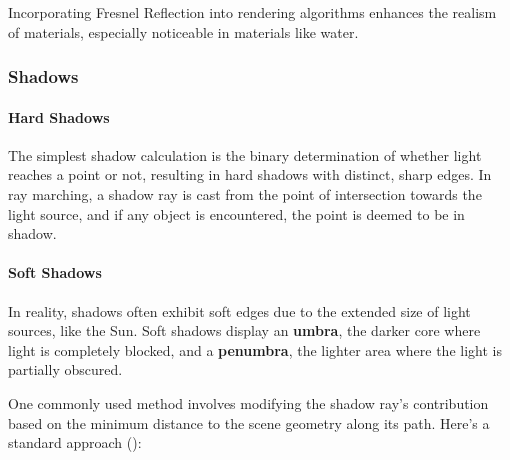 Incorporating Fresnel Reflection into rendering algorithms enhances the realism of materials, especially noticeable in materials like water. 

\subsubsection{Shadows}
\label{Shadows}

\paragraph{Hard Shadows}
The simplest shadow calculation is the binary determination of whether light reaches a point or not, resulting in hard shadows with distinct, sharp edges. In ray marching, a shadow ray is cast from the point of intersection towards the light source, and if any object is encountered, the point is deemed to be in shadow.

\paragraph{Soft Shadows}
In reality, shadows often exhibit soft edges due to the extended size of light sources, like the Sun. Soft shadows display an \textbf{umbra}, the darker core where light is completely blocked, and a \textbf{penumbra}, the lighter area where the light is partially obscured.


One commonly used method involves modifying the shadow ray's contribution based on the minimum distance to the scene geometry along its path. Here's a standard approach ():

